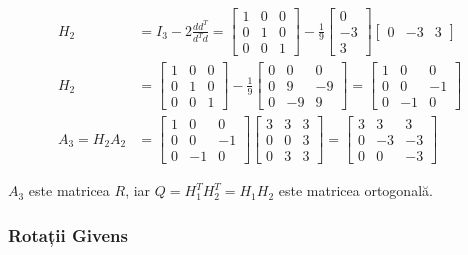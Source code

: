 \documentclass{exam}
\begin{document}
\begin{align*}
	H_2           & = I_3 - 2 \frac{d d^T}{d^T d} = \begin{bmatrix} 1 & 0 & 0 \\ 0 & 1 & 0 \\ 0 & 0 & 1 \end{bmatrix} - \frac{1}{9} \begin{bmatrix} 0 \\ -3 \\ 3 \end{bmatrix} \begin{bmatrix} 0 & -3 & 3 \end{bmatrix}                         \\
	H_2           & = \begin{bmatrix} 1 & 0 & 0 \\ 0 & 1 & 0 \\ 0 & 0 & 1 \end{bmatrix} - \frac{1}{9} \begin{bmatrix} 0 & 0 & 0 \\ 0 & 9 & -9 \\ 0 & -9 & 9 \end{bmatrix} = \begin{bmatrix} 1 & 0 & 0 \\ 0 & 0 & -1 \\ 0 & -1 & 0 \end{bmatrix} \\
	A_3 = H_2 A_2 & = \begin{bmatrix} 1 & 0 & 0 \\ 0 & 0 & -1 \\ 0 & -1 & 0 \end{bmatrix} \begin{bmatrix} 3 & 3 & 3 \\ 0 & 0 & 3 \\ 0 & 3 & 3 \end{bmatrix} = \begin{bmatrix} 3 & 3 & 3 \\ 0 & -3 & -3 \\ 0 & 0 & -3 \end{bmatrix}
\end{align*}

\par $A_3$ este matricea $R$, iar $Q = H_1^T H_2^T = H_1 H_2$ este matricea ortogonală.

\subsubsection{Rotații Givens}
\end{document}
